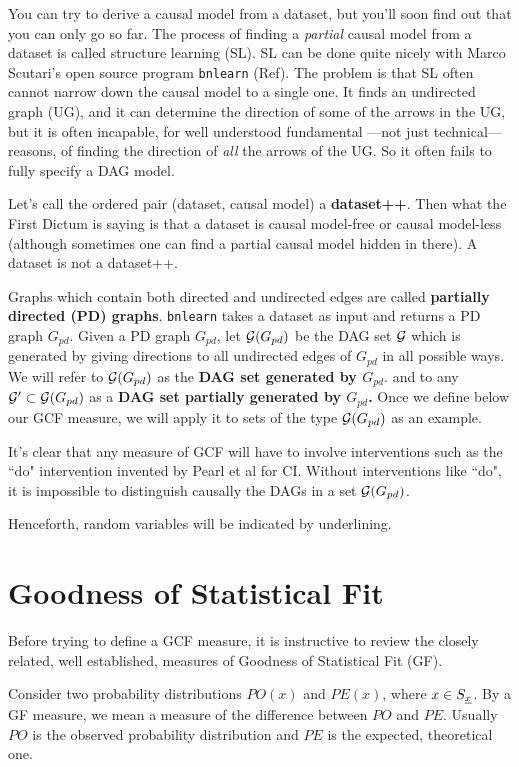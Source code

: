 You can try to derive a causal model from a dataset,
but you'll soon find out that you can only go so far.
The process of finding a {\it partial} causal model from a dataset
is called structure learning (SL).  SL can be done quite
 nicely with Marco Scutari's open source program 
{\tt bnlearn} (Ref\cite{bnlearn}).
The problem is that SL often cannot 
narrow down the causal model to a single one.
It finds an undirected graph (UG),
and it can determine the direction of some of the arrows in the UG, 
but it is often incapable, for well understood 
fundamental ---not just technical--- reasons,
 of finding the direction of {\it all}  the arrows of the UG. 
So it often fails to fully specify a DAG model.

Let's call the ordered pair
(dataset, causal model) a
{\bf dataset++}.
 Then what the First Dictum is saying is that a dataset 
is causal model-free or causal
model-less (although sometimes one can
find a partial causal model hidden in there).
A dataset is not a dataset++.

Graphs
which contain both directed 
and undirected edges
are called 
{\bf partially directed (PD) graphs}.
{\tt bnlearn} takes
a dataset as input
and returns a PD graph
$G_{pd}$.
Given a PD graph $G_{pd}$,
let ${\cal G}(G_{pd})$
be the DAG set ${\cal G}$
which 
is generated
by giving directions to all 
undirected edges of $G_{pd}$
in all possible ways.
We will refer to 
 ${\cal G}(G_{pd})$ as 
the {\bf DAG set generated by $G_{pd}$}.
and to any ${\cal G}'\subset 
{\cal G}(G_{pd})$ as a {\bf DAG set partially 
generated by $G_{pd}$.}
Once we define below our
 GCF measure,
we will apply it to
sets of the type ${\cal G}(G_{pd})$
as an example.


It's clear that any measure
of GCF will have to
involve interventions
such as the ``do" intervention
invented by Pearl et al 
for CI.
Without interventions like ``do",
it is impossible
to distinguish causally the
DAGs in a set ${\cal G}(G_{pd})$.

Henceforth, random variables
will be indicated by underlining.

\section{Goodness of Statistical Fit}
Before trying to
define a GCF measure,
it
is instructive to review 
the closely related, well established, measures
of Goodness of Statistical Fit (GF).



Consider 
two
probability distributions
$PO(x)$ and $PE(x)$,
where $x\in S_{\underline{x}}$.
By a GF measure, we mean 
a measure of the 
difference between 
$PO$ and $PE$.
Usually $PO$ is the
observed probability distribution and 
$PE$ is the expected, theoretical one.


